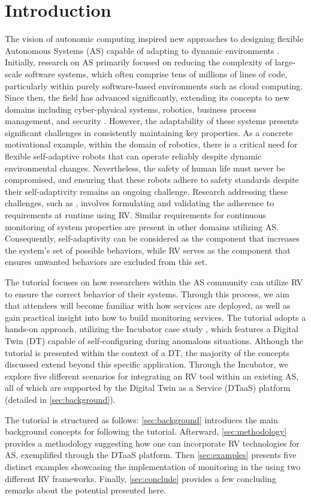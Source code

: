 \section{Introduction}

The vision of autonomic computing inspired new approaches to designing flexible Autonomous Systems (AS) capable of adapting to dynamic environments \cite{kephartVisionAutonomicComputing2003}.
Initially, research on AS primarily focused on reducing the complexity of large-scale software systems, which often comprise tens of millions of lines of code, particularly within purely software-based environments such as cloud computing.
Since then, the field has advanced significantly, extending its concepts to new domains including cyber-physical systems, robotics, business process management, and security .
However, the adaptability of these systems presents significant challenges in consistently maintaining key properties.
As a concrete motivational example, within the domain of robotics, there is a critical need for flexible self-adaptive robots that can operate reliably despite dynamic environmental changes.
Nevertheless, the safety of human life must never be compromised, and ensuring that these robots adhere to safety standards despite their self-adaptivity remains an ongoing challenge.
Research addressing these challenges, such as , involves formulating and validating the adherence to requirements at runtime using RV.
Similar requirements for continuous monitoring of system properties are present in other domains utilizing AS.
Consequently, self-adaptivity can be considered as the component that increases the system's set of possible behaviors, while RV serves as the component that ensures unwanted behaviors are excluded from this set.

The tutorial focuses on how researchers within the AS community can utilize RV to ensure the correct behavior of their systems.
Through this process, we aim that attendees will become familiar with how services are deployed, as well as gain practical insight into how to build monitoring services.
The tutorial adopts a hands-on approach, utilizing the Incubator case study \cite{Feng2021, Feng2022}, which features a Digital Twin (DT) capable of self-configuring during anomalous situations.
Although the tutorial is presented within the context of a DT, the majority of the concepts discussed extend beyond this specific application.
Through the Incubator, we explore five different scenarios for integrating an RV tool within an existing AS, all of which are supported by the Digital Twin as a Service (DTaaS) platform (detailed in \cref{sec:background}).

The tutorial is structured as follows: \cref{sec:background} introduces the main background concepts for following the tutorial.
Afterward, \cref{sec:methodology} provides a methodology suggesting how one can incorporate RV technologies for AS, exemplified through the DTaaS platform.
Then \cref{sec:examples} presents five distinct examples showcasing the implementation of monitoring in the using two different RV frameworks.
Finally, \cref{sec:conclude} provides a few concluding remarks about the potential presented here.

